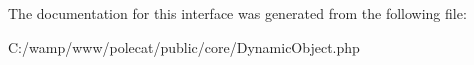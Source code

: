 


The documentation for this interface was generated from the following file\+:\begin{DoxyCompactItemize}
\item 
C\+:/wamp/www/polecat/public/core/Dynamic\+Object.\+php\end{DoxyCompactItemize}
